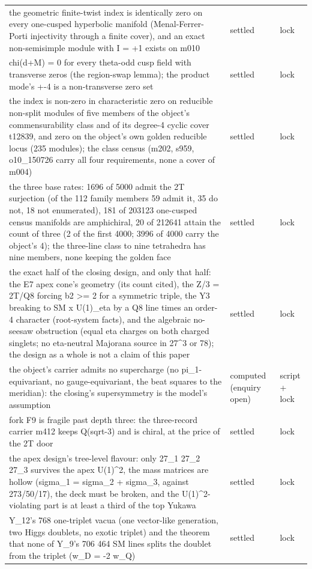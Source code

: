 \documentclass[11pt,a4paper]{article}
\theoremstyle{definition}
\theoremstyle{remark}
\begin{document}
\begin{longtable}{@{}p{9.2cm}p{2.9cm}p{2.0cm}@{}}
the geometric finite-twist index is identically zero on every one-cusped hyperbolic manifold (Menal-Ferrer-Porti injectivity through a finite cover), and an exact non-semisimple module with I = +1 exists on m010 & settled & lock \\
chi(d+M) = 0 for every theta-odd cusp field with transverse zeros (the region-swap lemma); the product mode's +-4 is a non-transverse zero set & settled & lock \\
the index is non-zero in characteristic zero on reducible non-split modules of five members of the object's commensurability class and of its degree-4 cyclic cover t12839, and zero on the object's own golden reducible locus (235 modules); the class census (m202, s959, o10\_150726 carry all four requirements, none a cover of m004) & settled & lock \\
the three base rates: 1696 of 5000 admit the 2T surjection (of the 112 family members 59 admit it, 35 do not, 18 not enumerated), 181 of 203123 one-cusped census manifolds are amphichiral, 20 of 212641 attain the count of three (2 of the first 4000; 3996 of 4000 carry the object's 4); the three-line class to nine tetrahedra has nine members, none keeping the golden face & settled & lock \\
the exact half of the closing design, and only that half: the E7 apex cone's geometry (its count cited), the Z/3 = 2T/Q8 forcing b2 >= 2 for a symmetric triple, the Y3 breaking to SM x U(1)\_eta by a Q8 line times an order-4 character (root-system facts), and the algebraic no-seesaw obstruction (equal eta charges on both charged singlets; no eta-neutral Majorana source in 27\^{}3 or 78); the design as a whole is not a claim of this paper & settled & lock \\
the object's carrier admits no supercharge (no pi\_1-equivariant, no gauge-equivariant, the beat squares to the meridian): the closing's supersymmetry is the model's assumption & computed (enquiry open) & script + lock \\
fork F9 is fragile past depth three: the three-record carrier m412 keeps Q(sqrt-3) and is chiral, at the price of the 2T door & settled & lock \\
the apex design's tree-level flavour: only 27\_1 27\_2 27\_3 survives the apex U(1)\^{}2, the mass matrices are hollow (sigma\_1 = sigma\_2 + sigma\_3, against 273/50/17), the deck must be broken, and the U(1)\^{}2-violating part is at least a third of the top Yukawa & settled & lock \\
Y\_12's 768 one-triplet vacua (one vector-like generation, two Higgs doublets, no exotic triplet) and the theorem that none of Y\_9's 706 464 SM lines splits the doublet from the triplet (w\_D = -2 w\_Q) & settled & lock \\

\end{longtable}
\end{document}
